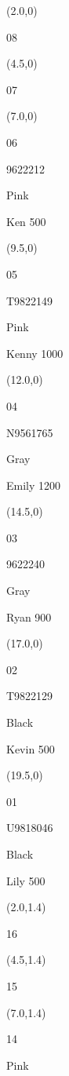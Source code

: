 \documentclass[a4paper]{article}
\newcommand{\myseat}[5]{%
\vspace{-0.1cm} \hspace{-0.5cm}
\parbox[t][2.2cm][t]{3.5cm}{%
\small #1 %
\begin{description}
\vspace{-0.1cm}
\item [ID:] #2
\vspace{-0.1cm}
\item [Team:] #3 \normalsize
\vspace{-0.1cm}
\item \normalsize #4 #5
\vspace{-0.1cm}
\end{description}
}
}
\begin{document}
\begin{CJK}{UTF8}{cyberbit}

\begin{textblock}{2.5}(2.0,0)
\textblockcolor{}
\myseat{08}{}{}{}{}
\end{textblock}

\begin{textblock}{2.5}(4.5,0)
\textblockcolor{}
\myseat{07}{}{}{}{}
\end{textblock}

\begin{textblock}{2.5}(7.0,0)
\myseat{06}{9622212}{Pink}{Ken}{500}
\end{textblock}

\begin{textblock}{2.5}(9.5,0)
\myseat{05}{T9822149}{Pink}{Kenny}{1000}
\end{textblock}

\begin{textblock}{2.5}(12.0,0)
\myseat{04}{N9561765}{Gray}{Emily}{1200}
\end{textblock}

\begin{textblock}{2.5}(14.5,0)
\myseat{03}{9622240}{Gray}{Ryan}{900}
\end{textblock}

\begin{textblock}{2.5}(17.0,0)
\myseat{02}{T9822129}{Black}{Kevin}{500}
\end{textblock}

\begin{textblock}{2.5}(19.5,0)
\myseat{01}{U9818046}{Black}{Lily}{500}
\end{textblock}


\begin{textblock}{2.5}(2.0,1.4)
\textblockcolor{}
\myseat{16}{}{}{}{}
\end{textblock}

\begin{textblock}{2.5}(4.5,1.4)
\textblockcolor{}
\myseat{15}{}{}{}{}
\end{textblock}

\begin{textblock}{2.5}(7.0,1.4)
\myseat{14}{}{Pink}{}{}
\end{textblock}


\end{CJK}
\end{document}

